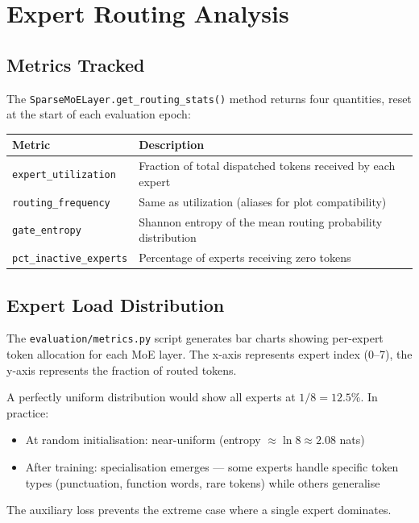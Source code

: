 \documentclass[11pt]{article}
\begin{document}
\section{Expert Routing Analysis}


\subsection{Metrics Tracked}


The \texttt{SparseMoELayer.get\_routing\_stats()} method returns four quantities, reset at the start of each evaluation epoch:


\begin{longtable}{|>{\raggedright\arraybackslash}p{}|>{\raggedright\arraybackslash}p{}|}
\hline
\textbf{Metric} & \textbf{Description} \\ \hline
\texttt{expert\_utilization} & Fraction of total dispatched tokens received by each expert \\ \hline
\texttt{routing\_frequency} & Same as utilization (aliases for plot compatibility) \\ \hline
\texttt{gate\_entropy} & Shannon entropy of the mean routing probability distribution \\ \hline
\texttt{pct\_inactive\_experts} & Percentage of experts receiving zero tokens \\ \hline
\end{longtable}

\subsection{Expert Load Distribution}


The \texttt{evaluation/metrics.py} script generates bar charts showing per-expert token allocation for each MoE layer. The x-axis represents expert index (0–7), the y-axis represents the fraction of routed tokens.


A perfectly uniform distribution would show all experts at $1/8 = 12.5\%$. In practice:

\begin{itemize}[leftmargin=*]
\item At random initialisation: near-uniform (entropy $\approx \ln 8 \approx 2.08$ nats)
\item After training: specialisation emerges — some experts handle specific token types (punctuation, function words, rare tokens) while others generalise

\end{itemize}
The auxiliary loss prevents the extreme case where a single expert dominates.
\end{document}

